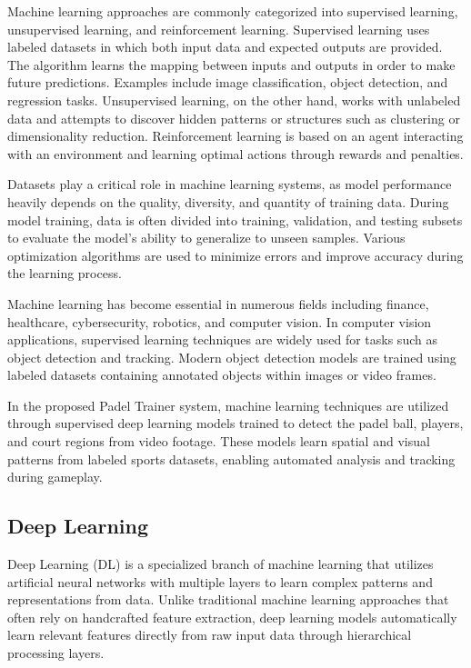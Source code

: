 Machine learning approaches are commonly categorized into supervised learning, unsupervised learning, and reinforcement learning. Supervised learning uses labeled datasets in which both input data and expected outputs are provided. The algorithm learns the mapping between inputs and outputs in order to make future predictions. Examples include image classification, object detection, and regression tasks. Unsupervised learning, on the other hand, works with unlabeled data and attempts to discover hidden patterns or structures such as clustering or dimensionality reduction. Reinforcement learning is based on an agent interacting with an environment and learning optimal actions through rewards and penalties.

Datasets play a critical role in machine learning systems, as model performance heavily depends on the quality, diversity, and quantity of training data. During model training, data is often divided into training, validation, and testing subsets to evaluate the model's ability to generalize to unseen samples. Various optimization algorithms are used to minimize errors and improve accuracy during the learning process.

Machine learning has become essential in numerous fields including finance, healthcare, cybersecurity, robotics, and computer vision. In computer vision applications, supervised learning techniques are widely used for tasks such as object detection and tracking. Modern object detection models are trained using labeled datasets containing annotated objects within images or video frames.

In the proposed Padel Trainer system, machine learning techniques are utilized through supervised deep learning models trained to detect the padel ball, players, and court regions from video footage. These models learn spatial and visual patterns from labeled sports datasets, enabling automated analysis and tracking during gameplay.

\subsection{Deep Learning}

Deep Learning (DL) is a specialized branch of machine learning that utilizes artificial neural networks with multiple layers to learn complex patterns and representations from data. Unlike traditional machine learning approaches that often rely on handcrafted feature extraction, deep learning models automatically learn relevant features directly from raw input data through hierarchical processing layers.

